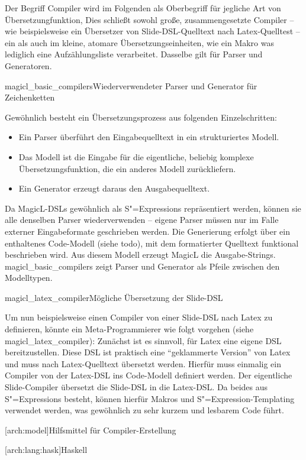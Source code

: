 \documentclass[11pt, a4paper, bibgerm]{scrbook}
\newcommand\lsection{}
\newcommand\lsubsection{}
\newcommand\sref{}
\newcommand\abb{}
\newcommand\fig{}
\newcommand{\sees}[1]{(siehe \sref{#1})}
\newcommand{\sexp}{S"=Expression}
\newcommand{\sexps}{S"=Expressions}
\begin{document}
Der Begriff Compiler wird im Folgenden als Oberbegriff für jegliche Art
von Übersetzungfunktion, Dies schließt sowohl große, zusammengesetzte
Compiler -- wie beispielsweise ein Übersetzer von Slide-DSL-Quelltext
nach Latex-Quelltest -- ein als auch im kleine, atomare
Übersetzungseinheiten, wie ein Makro was lediglich eine Aufzählungsliste
verarbeitet. Dasselbe gilt für Parser und Generatoren.

\fig{magicl_basic_compilers}{Wiederverwendeter Parser und Generator
für Zeichenketten}

Gewöhnlich besteht ein Übersetzungsprozess aus folgenden Einzelschritten:
\begin{itemize}
\item Ein Parser überführt den Eingabequelltext in ein strukturiertes
  Modell.
\item Das Modell ist die Eingabe für die eigentliche, beliebig komplexe
  Übersetzungsfunktion, die ein anderes Modell zurückliefern.
\item Ein Generator erzeugt daraus den Ausgabequelltext.
\end{itemize}

Da MagicL-DSLs gewöhnlich als \sexps{} repräsentiert werden, können
sie alle denselben Parser wiederverwenden -- eigene Parser
müssen nur im Falle externer Eingabeformate geschrieben werden. Die
Generierung erfolgt über ein enthaltenes Code-Modell \sees{todo}, mit dem
formatierter Quelltext funktional beschrieben wird. Aus diesem Modell
erzeugt MagicL die Ausgabe-Strings. \abb{magicl_basic_compilers} zeigt
Parser und Generator als Pfeile zwischen den Modelltypen.

\fig{magicl_latex_compiler}{Mögliche Übersetzung der Slide-DSL}

Um nun beispielsweise einen Compiler von einer Slide-DSL nach Latex zu
definieren, könnte ein Meta-Programmierer wie folgt vorgehen (siehe
\abb{magicl_latex_compiler}): Zunächst ist es sinnvoll, für Latex eine
eigene DSL bereitzustellen. Diese DSL ist praktisch eine ``geklammerte
Version'' von Latex und muss nach Latex-Quelltext übersetzt
werden. Hierfür muss einmalig ein Compiler von der Latex-DSL ins
Code-Modell definiert werden. Der eigentliche Slide-Compiler übersetzt
die Slide-DSL in die Latex-DSL. Da beides aus \sexps{} besteht, können
hierfür Makros und \sexp{}-Templating verwendet werden, was gewöhnlich
zu sehr kurzem und lesbarem Code führt.

\lsection[arch:model]{Hilfsmittel für Compiler-Erstellung}

\lsubsection[arch:lang:hask]{Haskell}
\end{document}
